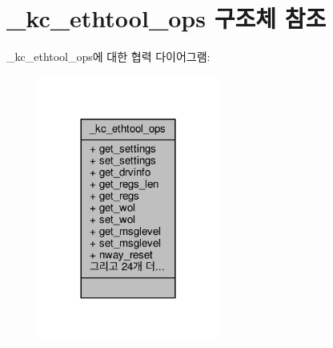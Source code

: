 \hypertarget{struct__kc__ethtool__ops}{}\section{\+\_\+kc\+\_\+ethtool\+\_\+ops 구조체 참조}
\label{struct__kc__ethtool__ops}


\+\_\+kc\+\_\+ethtool\+\_\+ops에 대한 협력 다이어그램\+:
\nopagebreak
\begin{figure}[H]
\begin{center}
\leavevmode
\includegraphics[width=168pt]{struct__kc__ethtool__ops__coll__graph}
\end{center}
\end{figure}
